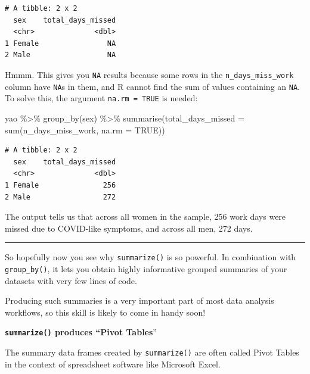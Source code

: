 \documentclass[
  letterpaper,
  DIV=11,
  numbers=noendperiod]{scrreprt}
\newenvironment{Shaded}{\begin{snugshade}}{\end{snugshade}}
\newcommand{\AttributeTok}[1]{\textcolor[rgb]{0.40,0.45,0.13}{#1}}
\newcommand{\ConstantTok}[1]{\textcolor[rgb]{0.56,0.35,0.01}{#1}}
\newcommand{\FunctionTok}[1]{\textcolor[rgb]{0.28,0.35,0.67}{#1}}
\newcommand{\NormalTok}[1]{\textcolor[rgb]{0.00,0.23,0.31}{#1}}
\newcommand{\SpecialCharTok}[1]{\textcolor[rgb]{0.37,0.37,0.37}{#1}}
\begin{document}
\begin{verbatim}
# A tibble: 2 x 2
  sex    total_days_missed
  <chr>              <dbl>
1 Female                NA
2 Male                  NA
\end{verbatim}

Hmmm. This gives you \texttt{NA} results because some rows in the
\texttt{n\_days\_miss\_work} column have \texttt{NA}s in them, and R
cannot find the sum of values containing an \texttt{NA}. To solve this,
the argument \texttt{na.rm\ =\ TRUE} is needed:

\begin{Shaded}
\begin{Highlighting}[]
\NormalTok{yao }\SpecialCharTok{\%\textgreater{}\%} 
  \FunctionTok{group\_by}\NormalTok{(sex) }\SpecialCharTok{\%\textgreater{}\%} 
  \FunctionTok{summarise}\NormalTok{(}\AttributeTok{total\_days\_missed =} \FunctionTok{sum}\NormalTok{(n\_days\_miss\_work, }\AttributeTok{na.rm =} \ConstantTok{TRUE}\NormalTok{))}
\end{Highlighting}
\end{Shaded}

\begin{verbatim}
# A tibble: 2 x 2
  sex    total_days_missed
  <chr>              <dbl>
1 Female               256
2 Male                 272
\end{verbatim}

The output tells us that across all women in the sample, 256 work days
were missed due to COVID-like symptoms, and across all men, 272 days.

\begin{center}\rule{0.5\linewidth}{0.5pt}\end{center}

So hopefully now you see why \texttt{summarize()} is so powerful. In
combination with \texttt{group\_by()}, it lets you obtain highly
informative grouped summaries of your datasets with very few lines of
code.

Producing such summaries is a very important part of most data analysis
workflows, so this skill is likely to come in handy soon!

\begin{tcolorbox}[enhanced jigsaw, colframe=quarto-callout-note-color-frame, rightrule=.15mm, opacityback=0, breakable, coltitle=black, colbacktitle=quarto-callout-note-color!10!white, bottomrule=.15mm, leftrule=.75mm, toprule=.15mm, arc=.35mm, bottomtitle=1mm, colback=white, left=2mm, opacitybacktitle=0.6, titlerule=0mm, title=\textcolor{quarto-callout-note-color}{\faInfo}\hspace{0.5em}{Vocab}, toptitle=1mm]

\textbf{\texttt{summarize()} produces ``Pivot Tables}''

The summary data frames created by \texttt{summarize()} are often called
Pivot Tables in the context of spreadsheet software like Microsoft
Excel.

\end{tcolorbox}
\end{document}
